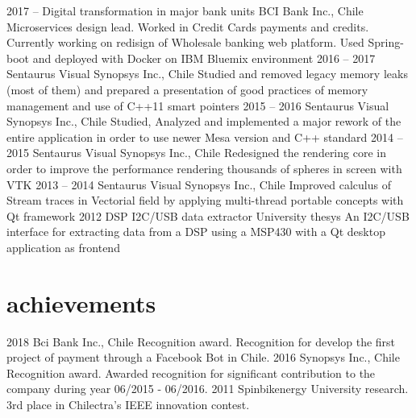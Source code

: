 \documentclass[]{friggeri-cv}
\begin{document}
\begin{entrylist}
  \entry
    {2017 – }
    {Digital transformation in major bank units}
    {BCI Bank Inc., Chile}
    {Microservices design lead. Worked in Credit Cards payments and credits. Currently working on redisign of Wholesale banking web platform. Used Spring-boot and deployed with Docker on IBM Bluemix environment}
  \entry
    {2016 – 2017}
    {Sentaurus Visual}
    {Synopsys Inc., Chile}
    {Studied and removed legacy memory leaks (most of them) and prepared a presentation of good practices of memory management and use of C++11 smart pointers}
  \entry
    {2015 – 2016}
    {Sentaurus Visual}
    {Synopsys Inc., Chile}
    {Studied, Analyzed and implemented a major rework of the entire application in order to use newer Mesa version and C++ standard}
  \entry
    {2014 – 2015}
    {Sentaurus Visual}
    {Synopsys Inc., Chile}
    {Redesigned the rendering core in order to improve the performance rendering thousands of spheres in screen with VTK}
  \entry
    {2013 – 2014}
    {Sentaurus Visual}
    {Synopsys Inc., Chile}
    {Improved calculus of Stream traces in Vectorial field by applying multi-thread portable concepts with Qt framework}
  \entry
    {2012}
    {DSP I2C/USB data extractor}
    {University thesys}
    {An I2C/USB interface for extracting data from a DSP using a MSP430 with a Qt desktop application as frontend}
\end{entrylist}

\section{achievements}

\begin{entrylist}
  \entry
    {2018}
    {Bci Bank Inc., Chile}
    {Recognition award.}
    {Recognition for develop the first project of payment through a Facebook Bot in Chile.}
  \entry
    {2016}
    {Synopsys Inc., Chile}
    {Recognition award.}
    {Awarded recognition for significant contribution to the company during year 06/2015 - 06/2016.}
  \entry
    {2011}
    {Spinbikenergy}
    {University research.}
    {3rd place in Chilectra's IEEE innovation contest.}
\end{entrylist}
\end{document}
